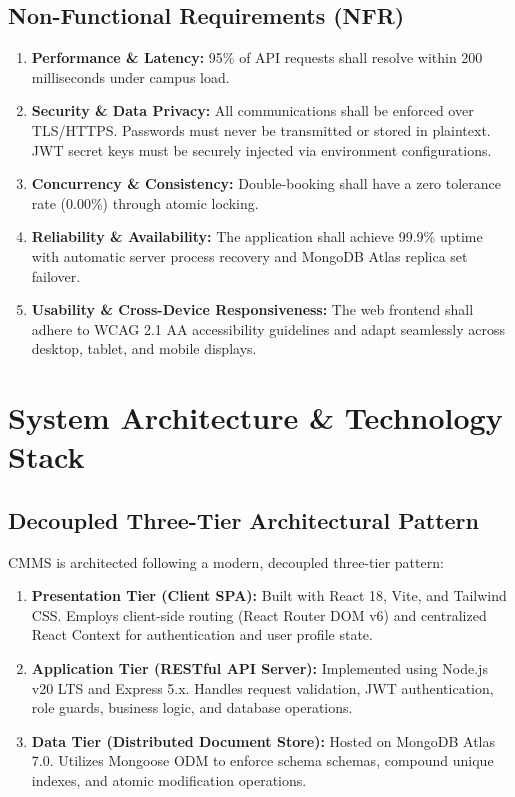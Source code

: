 \documentclass[11pt,a4paper]{article}
\begin{document}
\subsection{Non-Functional Requirements (NFR)}
\begin{enumerate}[label=\textbf{NFR-\arabic*}, leftmargin=2.5em, itemsep=0.3em]
  \item \textbf{Performance \& Latency:} 95\% of API requests shall resolve within 200 milliseconds under campus load.
  \item \textbf{Security \& Data Privacy:} All communications shall be enforced over TLS/HTTPS. Passwords must never be transmitted or stored in plaintext. JWT secret keys must be securely injected via environment configurations.
  \item \textbf{Concurrency \& Consistency:} Double-booking shall have a zero tolerance rate (0.00\%) through atomic locking.
  \item \textbf{Reliability \& Availability:} The application shall achieve 99.9\% uptime with automatic server process recovery and MongoDB Atlas replica set failover.
  \item \textbf{Usability \& Cross-Device Responsiveness:} The web frontend shall adhere to WCAG 2.1 AA accessibility guidelines and adapt seamlessly across desktop, tablet, and mobile displays.
\end{enumerate}

\section{System Architecture \& Technology Stack}

\subsection{Decoupled Three-Tier Architectural Pattern}
CMMS is architected following a modern, decoupled three-tier pattern:
\begin{enumerate}[leftmargin=1.4em, itemsep=0.2em]
  \item \textbf{Presentation Tier (Client SPA):} Built with React 18, Vite, and Tailwind CSS. Employs client-side routing (React Router DOM v6) and centralized React Context for authentication and user profile state.
  \item \textbf{Application Tier (RESTful API Server):} Implemented using Node.js v20 LTS and Express 5.x. Handles request validation, JWT authentication, role guards, business logic, and database operations.
  \item \textbf{Data Tier (Distributed Document Store):} Hosted on MongoDB Atlas 7.0. Utilizes Mongoose ODM to enforce schema schemas, compound unique indexes, and atomic modification operations.
\end{enumerate}
\end{document}
